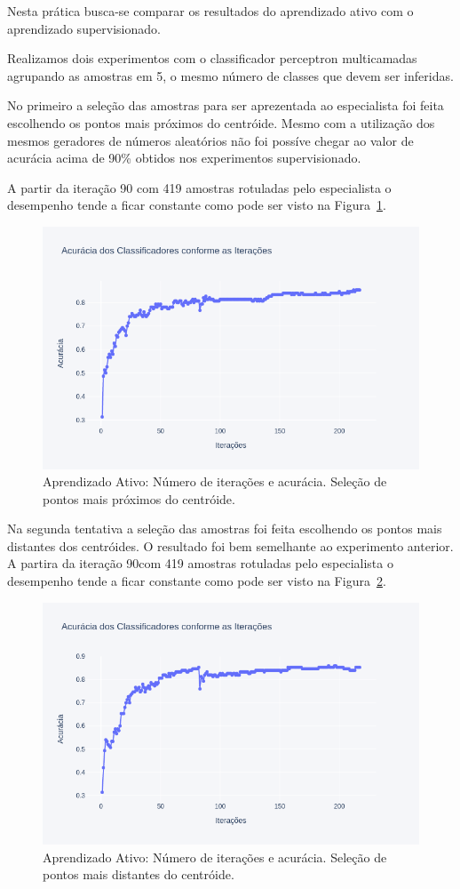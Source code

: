 Nesta prática busca-se comparar os resultados do aprendizado ativo com o aprendizado supervisionado.

Realizamos dois experimentos com o classificador perceptron multicamadas agrupando as amostras em 5, o mesmo número de classes que devem ser inferidas.

No primeiro a seleção das amostras para ser aprezentada ao especialista foi feita escolhendo os pontos mais próximos do centróide. Mesmo com a utilização dos mesmos geradores de números aleatórios não foi possíve chegar ao valor de acurácia acima de 90\% obtidos nos experimentos supervisionado.

A partir da iteração 90 com 419 amostras rotuladas pelo especialista o desempenho tende a ficar constante como pode ser visto na Figura~\ref{fig:line_active_min}.

\begin{figure}[!htbp]
	\centering
	\includegraphics[width=1.0\linewidth,clip=true,trim=0cm 0cm 0cm 0cm, keepaspectratio=true]{line_active_min.png}
	\caption{Aprendizado Ativo: Número de iterações e acurácia. Seleção de pontos mais próximos do centróide.}
	\label{fig:line_active_min}
\end{figure}

Na segunda tentativa a seleção das amostras foi feita escolhendo os pontos mais distantes dos centróides. O resultado foi bem semelhante ao experimento anterior. A partira da iteração 90com 419 amostras rotuladas pelo especialista o desempenho tende a ficar constante como pode ser visto na Figura~\ref{fig:line_active_max}.

\begin{figure}[!htbp]
	\centering
	\includegraphics[width=1.0\linewidth,clip=true,trim=0cm 0cm 0cm 0cm, keepaspectratio=true]{line_active_max.png}
	\caption{Aprendizado Ativo: Número de iterações e acurácia. Seleção de pontos mais distantes do centróide.}
	\label{fig:line_active_max}
\end{figure}
